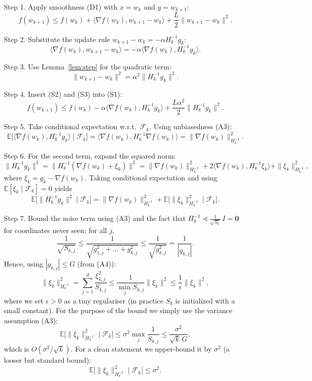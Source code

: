 \documentclass{article}
\begin{document}
\begin{enumerate}
\item[Step 1.] Apply smoothness (D1) with $x=w_{k}$ and $y=w_{k+1}$:
\[
f(w_{k+1})\le f(w_{k})+\langle\nabla f(w_{k}),w_{k+1}-w_{k}\rangle
               +\frac{L}{2}\|w_{k+1}-w_{k}\|^{2}.
\tag{S1}
\]

\item[Step 2.] Substitute the update rule $w_{k+1}-w_{k}= -\alpha H_{k}^{-1}g_{k}$:
\[
\langle\nabla f(w_{k}),w_{k+1}-w_{k}\rangle
   = -\alpha\langle\nabla f(w_{k}),H_{k}^{-1}g_{k}\rangle .
\tag{S2}
\]

\item[Step 3.] Use Lemma~\ref{lem:step} for the quadratic term:
\[
\|w_{k+1}-w_{k}\|^{2}= \alpha^{2}\|H_{k}^{-1}g_{k}\|^{2}.
\tag{S3}
\]

\item[Step 4.] Insert (S2) and (S3) into (S1):
\[
f(w_{k+1})\le f(w_{k})
 -\alpha\langle\nabla f(w_{k}),H_{k}^{-1}g_{k}\rangle
 +\frac{L\alpha^{2}}{2}\|H_{k}^{-1}g_{k}\|^{2}.
\tag{S4}
\]

\item[Step 5.] Take conditional expectation w.r.t.\ $\mathcal{F}_{k}$.
Using unbiasedness (A3):
\[
\mathbb{E}\!\bigl[\langle\nabla f(w_{k}),H_{k}^{-1}g_{k}\rangle\mid\mathcal{F}_{k}\bigr]
   = \langle\nabla f(w_{k}),H_{k}^{-1}\nabla f(w_{k})\rangle
   = \|\nabla f(w_{k})\|^{2}_{H_{k}^{-1}} .
\tag{S5}
\]

\item[Step 6.] For the second term, expand the squared norm:
\[
\|H_{k}^{-1}g_{k}\|^{2}
 = \|H_{k}^{-1}(\nabla f(w_{k})+\xi_{k})\|^{2}
 = \|\nabla f(w_{k})\|^{2}_{H_{k}^{-1}}
   +2\langle\nabla f(w_{k}),H_{k}^{-1}\xi_{k}\rangle
   +\|\xi_{k}\|^{2}_{H_{k}^{-1}},
\]
where $\xi_{k}=g_{k}-\nabla f(w_{k})$.
Taking conditional expectation and using $\mathbb{E}[\xi_{k}\mid\mathcal{F}_{k}]=0$ yields
\[
\mathbb{E}\!\bigl[\|H_{k}^{-1}g_{k}\|^{2}\mid\mathcal{F}_{k}\bigr]
 = \|\nabla f(w_{k})\|^{2}_{H_{k}^{-1}}
   +\mathbb{E}\!\bigl[\|\xi_{k}\|^{2}_{H_{k}^{-1}}\mid\mathcal{F}_{k}\bigr].
\tag{S6}
\]

\item[Step 7.] Bound the noise term using (A3) and the fact that $H_{k}^{-1}\preceq \frac{1}{\sqrt{S_{0}}}\,I=\mathbf{0}$ for coordinates never seen; for all $j$,
\[
\frac{1}{\sqrt{S_{k,j}}}\le \frac{1}{\sqrt{g_{1,j}^{2}+\dots+g_{k,j}^{2}}}
\le \frac{1}{\sqrt{g_{k,j}^{2}}}= \frac{1}{|g_{k,j}|}.
\]
Hence, using $|g_{k,j}|\le G$ (from (A4)):
\[
\|\xi_{k}\|^{2}_{H_{k}^{-1}}
   =\sum_{j=1}^{d}\frac{\xi_{k,j}^{2}}{S_{k,j}}
   \le\frac{1}{\min_{j} S_{k,j}}\|\xi_{k}\|^{2}
   \le\frac{1}{\epsilon}\|\xi_{k}\|^{2},
\]
where we set $\epsilon>0$ as a tiny regulariser (in practice $S_{k}$ is initialized with a small constant). For the purpose of the bound we simply use the variance assumption (A3):
\[
\mathbb{E}\!\bigl[\|\xi_{k}\|^{2}_{H_{k}^{-1}}\mid\mathcal{F}_{k}\bigr]
 \le \sigma^{2}\max_{j}\frac{1}{S_{k,j}}
 \le \frac{\sigma^{2}}{\sqrt{k}\,G},
\]
which is $O(\sigma^{2}/\sqrt{k})$. For a clean statement we upper‑bound it by $\sigma^{2}$ (a looser but standard bound):
\[
\mathbb{E}\!\bigl[\|\xi_{k}\|^{2}_{H_{k}^{-1}}\mid\mathcal{F}_{k}\bigr]\le\sigma^{2}.
\tag{S7}
\]


\end{enumerate}
\end{document}
